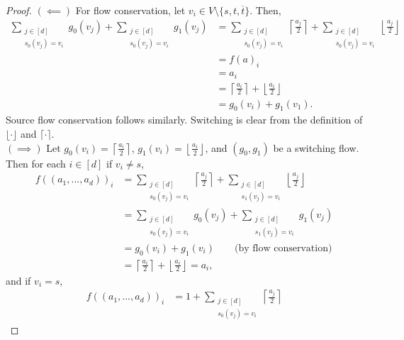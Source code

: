   \begin{proof}
    $(\impliedby)$ For flow conservation, let $v_i \in V \setminus \{s, t, \overline{t}\}$. Then,
    \begin{align*}
      \sum_{\substack{j \in [d] \\ s_0(v_j) = v_i}} g_0(v_j) 
      + \sum_{\substack{j \in [d] \\ s_0(v_j) = v_i}} g_1(v_j) &= 
      \sum_{\substack{j \in [d] \\ s_0(v_j) = v_i}}  \left\lceil \frac{a_j}{2} \right\rceil
      + \sum_{\substack{j \in [d] \\ s_0(v_j) = v_i}} \left\lfloor \frac{a_j}{2} \right\rfloor \\
      &= f(a)_i \\ 
      &= a_i \\ 
      &= \left\lceil \frac{a_i}{2}\right\rceil + \left\lfloor \frac{a_i}{2}\right\rfloor \\
      &= g_0(v_i) + g_1(v_1).
    \end{align*}
    Source flow conservation follows similarly. Switching is clear from the definition of $\lfloor \cdot \rfloor$
    and $\lceil \cdot \rceil$. \\
    $(\implies)$ Let $g_0(v_i) = \left\lceil \frac{a_i}{2} \right\rceil$, 
    $g_1(v_i) = \left\lfloor \frac{a_i}{2} \right\rfloor$, and $(g_0, g_1)$ be a switching flow. Then
    for each $i \in [d]$ if $v_i \neq s$,
    \begin{align*}
      f((a_1, ..., a_d))_i &= 
    \sum_{\substack{j \in [d] \\ s_0(v_j) = v_i}} \left\lceil \frac{a_j}{2} \right\rceil
      + \sum_{\substack{j \in [d] \\ s_1(v_j) = v_i}} \left\lfloor \frac{a_j}{2} \right\rfloor \\
      &= \sum_{\substack{j \in [d] \\ s_0(v_j) = v_i}}  g_0(v_j) 
      + \sum_{\substack{j \in [d] \\ s_1(v_j) = v_i}}  g_1(v_j) \\
      &= g_0(v_i) + g_1(v_i) \qquad \text{(by flow conservation)} \\
      &= \left\lceil \frac{a_i}{2} \right\rceil + \left\lfloor \frac{a_i}{2} \right\rfloor = a_i,
    \end{align*}
    and if $v_i = s$,
    \begin{align*}
      f((a_1, ..., a_d))_i &= 
    1 + \sum_{\substack{j \in [d] \\ s_0(v_j) = v_i}} \left\lceil \frac{a_j}{2} \right\rceil

\end{align*}
\end{proof}
